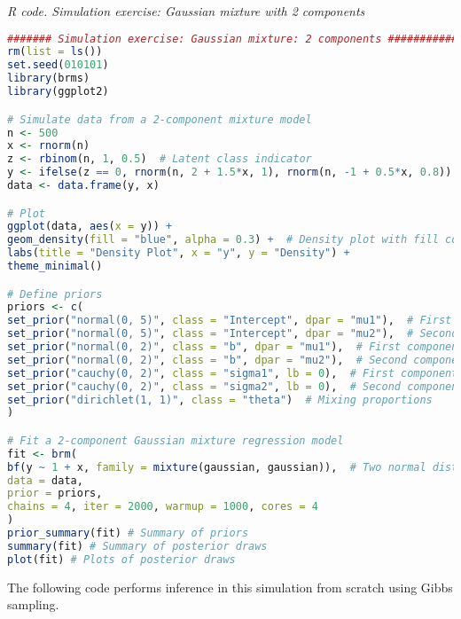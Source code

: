\begin{tcolorbox}[enhanced,width=4.67in,center upper,
	fontupper=\large\bfseries,drop shadow southwest,sharp corners]
	\textit{R code. Simulation exercise: Gaussian mixture with 2 components}
	\begin{VF}
		\begin{lstlisting}[language=R]
####### Simulation exercise: Gaussian mixture: 2 components #############
rm(list = ls())
set.seed(010101)
library(brms)
library(ggplot2)

# Simulate data from a 2-component mixture model
n <- 500
x <- rnorm(n)
z <- rbinom(n, 1, 0.5)  # Latent class indicator
y <- ifelse(z == 0, rnorm(n, 2 + 1.5*x, 1), rnorm(n, -1 + 0.5*x, 0.8))
data <- data.frame(y, x)

# Plot
ggplot(data, aes(x = y)) +
geom_density(fill = "blue", alpha = 0.3) +  # Density plot with fill color
labs(title = "Density Plot", x = "y", y = "Density") +
theme_minimal()

# Define priors
priors <- c(
set_prior("normal(0, 5)", class = "Intercept", dpar = "mu1"),  # First component intercept
set_prior("normal(0, 5)", class = "Intercept", dpar = "mu2"),  # Second component intercept
set_prior("normal(0, 2)", class = "b", dpar = "mu1"),  # First component slope
set_prior("normal(0, 2)", class = "b", dpar = "mu2"),  # Second component slope
set_prior("cauchy(0, 2)", class = "sigma1", lb = 0),  # First component sigma
set_prior("cauchy(0, 2)", class = "sigma2", lb = 0),  # Second component sigma
set_prior("dirichlet(1, 1)", class = "theta")  # Mixing proportions
)

# Fit a 2-component Gaussian mixture regression model
fit <- brm(
bf(y ~ 1 + x, family = mixture(gaussian, gaussian)),  # Two normal distributions
data = data,
prior = priors,
chains = 4, iter = 2000, warmup = 1000, cores = 4
)
prior_summary(fit) # Summary of priors
summary(fit) # Summary of posterior draws
plot(fit) # Plots of posterior draws
		\end{lstlisting}
	\end{VF}
\end{tcolorbox}

The following code performs inference in this simulation from scratch using Gibbs sampling.

